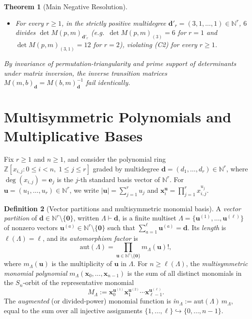 \documentclass[11pt,a4paper]{article}
\newtheorem{theorem}{Theorem}[section]
\theoremstyle{definition}
\newtheorem{definition}[theorem]{Definition}
\theoremstyle{remark}
\newcommand{\NN}{\mathbb{N}}
\newcommand{\ZZ}{\mathbb{Z}}
\newcommand{\aut}{\mathrm{aut}}
\newcommand{\vecd}{\mathbf{d}}
\newcommand{\vecu}{\mathbf{u}}
\newcommand{\vece}{\mathbf{e}}
\newcommand{\vecx}{\mathbf{x}}
\begin{document}
\begin{theorem}[Main Negative Resolution]
\begin{enumerate}
\begin{itemize}
    \item For \emph{every} $r \ge 1$, in the strictly positive multidegree $\vecd'_r = (3,1,\dots,1) \in \NN^r$, $6$ divides $\det M(p,m)_{\vecd'_r}$ (e.g.\ $\det M(p,m)_{(3)} = 6$ for $r=1$ and $\det M(p,m)_{(3,1)} = 12$ for $r=2$), violating \emph{(C2)} for every $r \ge 1$.
  \end{itemize}
\end{enumerate}
By invariance of permutation-triangularity and prime support of determinants under matrix inversion, the inverse transition matrices $M(m,b)_{\vecd} = M(b,m)_{\vecd}^{-1}$ fail identically.
\end{theorem}

\section{Multisymmetric Polynomials and Multiplicative Bases}

Fix $r \ge 1$ and $n \ge 1$, and consider the polynomial ring $\ZZ[x_{i,j} : 0 \le i < n,\; 1 \le j \le r]$ graded by multidegree $\vecd = (d_1, \dots, d_r) \in \NN^r$, where $\deg(x_{i,j}) = \vece_j$ is the $j$-th standard basis vector of $\NN^r$. For $\vecu = (u_1, \dots, u_r) \in \NN^r$, we write $|\vecu| = \sum_{j=1}^r u_j$ and $\vecx_i^{\vecu} = \prod_{j=1}^r x_{i,j}^{u_j}$.

\begin{definition}[Vector partitions and multisymmetric monomial basis]
A \emph{vector partition} of $\vecd \in \NN^r \setminus \{\mathbf{0}\}$, written $\Lambda \vdash \vecd$, is a finite multiset $\Lambda = \{\vecu^{(1)}, \dots, \vecu^{(\ell)}\}$ of nonzero vectors $\vecu^{(a)} \in \NN^r \setminus \{\mathbf{0}\}$ such that $\sum_{a=1}^\ell \vecu^{(a)} = \vecd$. Its \emph{length} is $\ell(\Lambda) = \ell$, and its \emph{automorphism factor} is
\[
  \aut(\Lambda) = \prod_{\vecu \in \NN^r \setminus \{\mathbf{0}\}} m_\Lambda(\vecu)!,
\]
where $m_\Lambda(\vecu)$ is the multiplicity of $\vecu$ in $\Lambda$. For $n \ge \ell(\Lambda)$, the \emph{multisymmetric monomial polynomial} $m_\Lambda(\vecx_0, \dots, \vecx_{n-1})$ is the sum of all distinct monomials in the $S_n$-orbit of the representative monomial
\[
  M_\Lambda := \vecx_0^{\vecu^{(1)}} \vecx_1^{\vecu^{(2)}} \cdots \vecx_{\ell-1}^{\vecu^{(\ell)}}.
\]
The \emph{augmented} (or divided-power) monomial function is $\tilde{m}_\Lambda := \aut(\Lambda)\, m_\Lambda$, equal to the sum over all injective assignments $\{1,\dots,\ell\} \hookrightarrow \{0,\dots,n-1\}$.
\end{definition}
\end{document}
